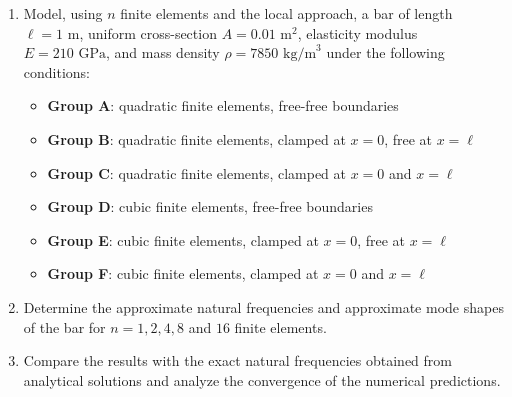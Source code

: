 \documentclass[12pt]{article}
\begin{document}
\begin{center}
\end{center}
\begin{enumerate}
  \item[a)] Model, using $n$ finite elements and the local approach, a bar of length $\ell=1\text{ m}$, uniform cross-section $A=0.01\text{ m}^2$, elasticity modulus $E=210\text{ GPa}$, and mass density $\rho=7850\text{ kg/m}^{3}$ under the following conditions:
        \begin{itemize}
          \item \textbf{Group A}: quadratic finite elements, free-free boundaries
          \item \textbf{Group B}: quadratic finite elements, clamped at $x = 0$, free at $x = \ell$
          \item \textbf{Group C}: quadratic finite elements, clamped at $x = 0$ and $x = \ell$
          \item \textbf{Group D}: cubic finite elements, free-free boundaries
          \item \textbf{Group E}: cubic finite elements, clamped at $x = 0$, free at $x = \ell$
          \item \textbf{Group F}: cubic finite elements, clamped at $x = 0$ and $x = \ell$
        \end{itemize}
  \item[b)] Determine the approximate natural frequencies and approximate mode shapes of the bar for $n = 1, 2, 4, 8$ and $16$ finite elements.
  \item[c)] Compare the results with the exact natural frequencies obtained from analytical solutions and analyze the convergence of the numerical predictions.
\end{enumerate}
\end{document}
